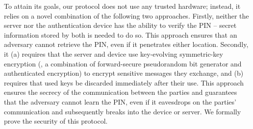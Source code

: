 To attain its goals, our protocol does not use any trusted hardware; instead, it relies on a novel combination of the following two approaches. Firstly, neither the server nor the authentication device has the ability to verify the PIN -- secret information stored by both is needed to do so. This approach ensures that an adversary cannot retrieve the PIN, even if it penetrates either location. 
Secondly, it  (a) requires that the server and device use key-evolving symmetric-key encryption (\ie, a combination of forward-secure pseudorandom bit generator and authenticated encryption) to encrypt sensitive messages they exchange,  and (b) requires that used keys be discarded immediately after their use.
This approach ensures the secrecy of the communication between the parties and guarantees that the adversary cannot learn the PIN, even if it eavesdrops on the parties' communication and subsequently breaks into the device or server. We formally prove the security of this protocol. 





%
%





% 





